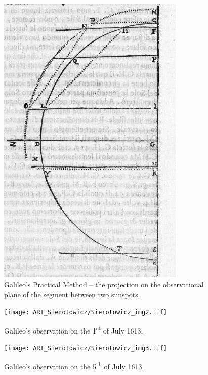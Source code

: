 \begin{artengenv}
\begin{figure}[h]
	\centering
	\includegraphics[width=0.8\textwidth]{ART_Sierotowicz/Sierotowicz_img1.jpg} 
	\caption{Galileo’s Practical Method -- the projection on the observational plane of the segment between two sunspots.}
\end{figure}

\begin{figure}[h]
	\centering
	\texttt{[image: ART\_Sierotowicz/Sierotowicz\_img2.tif]} 
	\caption{Galileo’s observation on the 1\textsuperscript{st} of July 1613.}
\end{figure}

\begin{figure}[h]
	\centering
	\texttt{[image: ART\_Sierotowicz/Sierotowicz\_img3.tif]} 
	\caption{Galileo’s observation on the 5\textsuperscript{th} of July 1613.}
\end{figure}


\end{artengenv}
